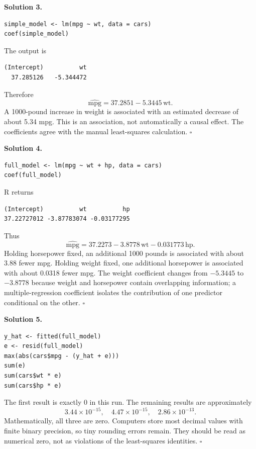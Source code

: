 \documentclass[11pt]{article}
\newenvironment{answer}[1]
 {\par\medskip\noindent\color{green}\textbf{Solution #1.}\color{black}\ }
 {\hfill$\square$\par\medskip}
\begin{document}
\begin{answer}{3}
\begin{lstlisting}
simple_model <- lm(mpg ~ wt, data = cars)
coef(simple_model)
\end{lstlisting}
The output is
\begin{lstlisting}
(Intercept)          wt
  37.285126   -5.344472
\end{lstlisting}
Therefore
\[
 \widehat{\mathrm{mpg}}=37.2851-5.3445\,\mathrm{wt}.
\]
A 1000-pound increase in weight is associated with an estimated decrease of
about 5.34 mpg. This is an association, not automatically a causal effect.
The coefficients agree with the manual least-squares calculation.
\end{answer}

\begin{answer}{4}
\begin{lstlisting}
full_model <- lm(mpg ~ wt + hp, data = cars)
coef(full_model)
\end{lstlisting}
R returns
\begin{lstlisting}
(Intercept)          wt          hp
37.22727012 -3.87783074 -0.03177295
\end{lstlisting}
Thus
\[
 \widehat{\mathrm{mpg}}
 =37.2273-3.8778\,\mathrm{wt}-0.031773\,\mathrm{hp}.
\]
Holding horsepower fixed, an additional 1000 pounds is associated with about
3.88 fewer mpg. Holding weight fixed, one additional horsepower is associated
with about 0.0318 fewer mpg. The weight coefficient changes from $-5.3445$ to
$-3.8778$ because weight and horsepower contain overlapping information; a
multiple-regression coefficient isolates the contribution of one predictor
conditional on the other.
\end{answer}

\begin{answer}{5}
\begin{lstlisting}
y_hat <- fitted(full_model)
e <- resid(full_model)
max(abs(cars$mpg - (y_hat + e)))
sum(e)
sum(cars$wt * e)
sum(cars$hp * e)
\end{lstlisting}
The first result is exactly 0 in this run. The remaining results are
approximately
\[
 3.44\times10^{-15},\quad
 4.47\times10^{-15},\quad
 2.86\times10^{-13}.
\]
Mathematically, all three are zero. Computers store most decimal values with
finite binary precision, so tiny rounding errors remain. They should be read as
numerical zero, not as violations of the least-squares identities.
\end{answer}
\end{document}
